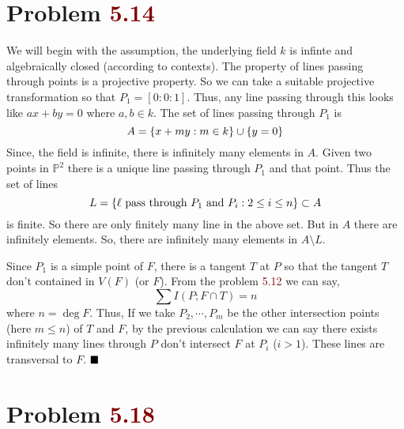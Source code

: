 \documentclass[12pt]{article}
\begin{document}
\section*{Problem \textcolor{maroon}{5.14}}
We will begin with the assumption, the underlying field $k$ is infinte and algebraically closed (according to contexts). The property of lines passing through points is a projective property. So we can take a suitable projective transformation so that $P_1 = [0:0:1]$. Thus, any line passing through this looks like $ax +by = 0$ where $a,b \in k$. The set of lines passing through $P_1$ is $$A = \qty{x+my : m \in k} \cup \qty{y=0}$$ Since, the field is infinite, there is infinitely many elements in $A$. Given two points in $\mathbb{P}^2$ there is a unique line passing through $P_1$ and that point. Thus the set of lines $$L=\qty{\ell \text{ pass through } P_1 \text{ and }P_{i} : 2 \leq i \leq n} \subset A$$ is finite. So there are only finitely many line in the above set. But in $A$ there are infinitely elements. So, there are infinitely many elements in $A \setminus L$.

\vspace*{0.2cm}

\noindent Since $P_1$ is a simple point of $F$, there is a tangent $T$ at $P$ so that the tangent $T$ don't contained in $V(F)$ (or $F$). From the problem \textcolor{maroon}{5.12} we can say, $$\sum I(P;F\cap T)=n$$ where $n = \deg F$. Thus, If we take $P_2,\cdots,P_m$ be the other intersection points (here $m \leq n$) of $T$ and $F$, by the previous calculation we can say there exists infinitely many lines through $P$ don't intersect $F$ at $P_i$ ($i >1$). These lines are transversal to $F$. $\hfill \blacksquare$

\section*{Problem \textcolor{maroon}{5.18}}
\end{document}
